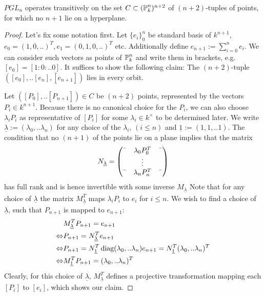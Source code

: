 \begin{theorem} \label{theoremGroupAction}
$PGL_n$ operates transitively on the set $C \subset (\operatorname{\mathbb P}^n_k)^{n+2}$ of $(n+2)$-tuples of points, for which no $n+1$ lie on a hyperplane.
\end{theorem}
\begin{proof}
Let's fix some notation first. Let $\{ e_i \}_0^n$ be standard basis of $k^{n+1}$, $e_0 = (1,0,..)^T, e_1 = (0,1,0,..)^T$ etc.
Additionally define $e_{n+1} := \sum_{i=0}^n e_i$.
We can consider such vectors as points of $\operatorname{\mathbb P}^n_k$ and write them in brackets, e.g. $[e_0] = [1:0:..0]$.
It suffices to show the following claim: The $(n+2)$-tuple $([e_0],..[e_n],[e_{n+1}])$ lies in every orbit.

Let $([P_0],..[P_{n+1}]) \in C$ be $(n+2)$ points, represented by the vectors $P_i \in k^{n+1}$.
Because there is no canonical choice for the $P_i$, we can also choose $\lambda_i P_i$ as representative of $[P_i]$ for some $\lambda_i \in k^\times$ to be determined later.
We write $\underline \lambda  := (\lambda_0,..\lambda_n)$ for any choice of the $\lambda_i,\,(i\leq n)$ and $\underline 1 := (1,1,..1)$.
The condition that no $(n+1)$ of the points lie on a plane implies that the matrix
\begin{equation}
N_{\underline\lambda}
=
\begin{pmatrix}
\textemdash & \lambda_0 P_0^T & \textemdash \\
& \vdots &  \\
\textemdash & \lambda_n P_n^T & \textemdash \\
\end{pmatrix}
\end{equation}
has full rank and is hence invertible with some inverse $M_{\underline\lambda}$
Note that for any choice of $\underline\lambda$ the matrix $M_{\underline\lambda}^T$ maps $\lambda_iP_i$ to $e_i$ for $i \leq  n$.
We wish to find a choice of $\underline\lambda$, such that $P_{n+1}$ is mapped to $e_{n+1}$:
\begin{align}
& M_{\underline\lambda}^TP_{n+1} = e_{n+1} \\
\Leftrightarrow & P_{n+1} = N_{\underline\lambda}^T e_{n+1} \\
\Leftrightarrow & P_{n+1} = N_{\underline 1}^T \operatorname{\text{diag}}(\lambda_0,..\lambda_n) e_{n+1}
                          = N_{\underline 1}^T (\lambda_0,..\lambda_n)^T \\
\Leftrightarrow & M_{\underline 1}^T P_{n+1} = (\lambda_0,..\lambda_n)^T
\end{align}
Clearly, for this choice of $\underline\lambda$, $M_{\underline \lambda}^T$ defines a projective transformation mapping each $[P_i]$ to $[e_i]$, which shows our claim.
\end{proof}

